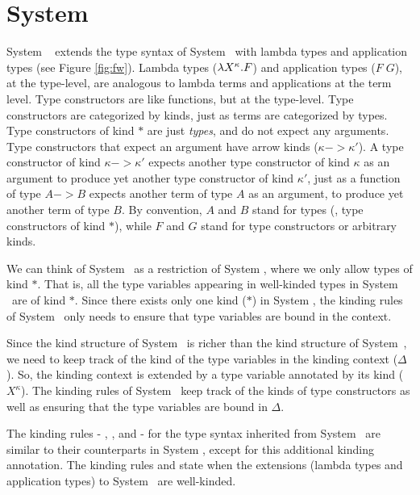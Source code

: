 \newpage
\section{System \Fw} \label{sec:fw}
System \Fw\ \cite{Gir72} extends the type syntax of System \F\ with lambda types
and application types (see Figure \ref{fig:fw}). Lambda types ($\lambda X^\kappa.F$)
and application types ($F\;G$), at the type-level, are analogous to lambda terms
and applications at the term level. Type constructors are like functions, but
at the type-level. Type constructors are categorized by kinds, just as terms
are categorized by types. Type constructors of kind $*$ are just \emph{types},
and do not expect any arguments. Type constructors that expect an argument
have arrow kinds ($\kappa -> \kappa'$). A type constructor of kind
$\kappa -> \kappa'$ expects another type constructor of kind $\kappa$
as an argument to produce yet another type constructor of kind $\kappa'$,
just as a function of type $A -> B$ expects another term of type $A$
as an argument, to produce yet another term of type $B$. By convention,
$A$ and $B$ stand for types (\ie, type constructors of kind $*$),
while $F$ and $G$ stand for type constructors or arbitrary kinds.

We can think of System \F\ as a restriction of System \Fw, where we only
allow types of kind $*$. That is, all the type variables appearing in
well-kinded types in System \F\ are of kind $*$. Since there exists only
one kind ($*$) in System \F, the kinding rules of System \F\ only needs to
ensure that type variables are bound in the context.

Since the kind structure of System \Fw\ is richer than the kind structure of
System~\F, we need to keep track of the kind of the type variables in
the kinding context ($\Delta$). So, the kinding context is extended by
a type variable annotated by its kind ($X^\kappa$). The kinding rules of
System \Fw\ keep track of the kinds of type constructors as well as ensuring
that the type variables are bound in $\Delta$.

The kinding rules - , , and 
- for the type syntax inherited from System \F\ are similar to
their counterparts in System \F, except for this additional kinding annotation.
The kinding rules  and  state when the extensions
(lambda types and application types) to System \F\ are well-kinded.

